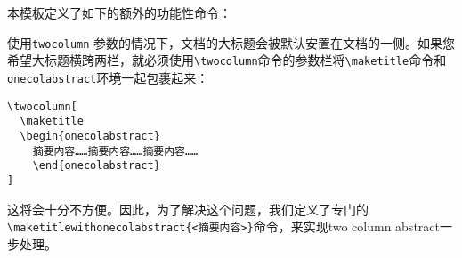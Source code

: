 本模板定义了如下的额外的功能性命令：


\begin{remark}
  使用\texttt{twocolumn} 参数的情况下，文档的大标题会被默认安置在文档的一侧。如果您希望大标题横跨两栏，就必须使用\texttt{\textbackslash twocolumn}命令的参数栏将\texttt{\textbackslash maketitle}命令和\texttt{onecolabstract}环境一起包裹起来：

\begin{verbatim}
\twocolumn[
  \maketitle
  \begin{onecolabstract}
    摘要内容……摘要内容……摘要内容……
    \end{onecolabstract}
]
\end{verbatim}

  这将会十分不方便。因此，为了解决这个问题，我们定义了专门的\texttt{\textbackslash maketitlewithonecolabstract\{<摘要内容>\}}命令，来实现two column abstract一步处理。
\end{remark}